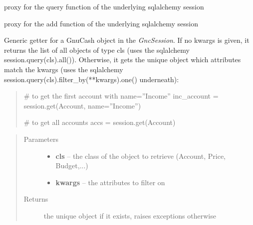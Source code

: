 \documentclass[letterpaper,10pt,english]{sphinxmanual}
\begin{document}
\begin{fulllineitems}
\begin{fulllineitems}
\end{fulllineitems}


\begin{fulllineitems}
\label{api/piecash.model_core.session:piecash.model_core.session.GncSession.query}
proxy for the query function of the underlying sqlalchemy session

\end{fulllineitems}


\begin{fulllineitems}
\label{api/piecash.model_core.session:piecash.model_core.session.GncSession.add}
proxy for the add function of the underlying sqlalchemy session

\end{fulllineitems}


\begin{fulllineitems}
\label{api/piecash.model_core.session:piecash.model_core.session.GncSession.get}
Generic getter for a GnuCash object in the \emph{GncSession}. If no kwargs is given, it returns the list of all
objects of type cls (uses the sqlalchemy session.query(cls).all()).
Otherwise, it gets the unique object which attributes match the kwargs
(uses the sqlalchemy session.query(cls).filter\_by(**kwargs).one() underneath):
\begin{quote}

\# to get the first account with name=''Income''
inc\_account = session.get(Account, name=''Income'')

\# to get all accounts
accs = session.get(Account)
\end{quote}
\begin{quote}\begin{description}
\item[{Parameters}] \leavevmode\begin{itemize}
\item {} 
\textbf{cls} -- the class of the object to retrieve (Account, Price, Budget,...)

\item {} 
\textbf{kwargs} -- the attributes to filter on

\end{itemize}

\item[{Returns}] \leavevmode
the unique object if it exists, raises exceptions otherwise

\end{description}\end{quote}

\end{fulllineitems}


\end{fulllineitems}
\end{document}
